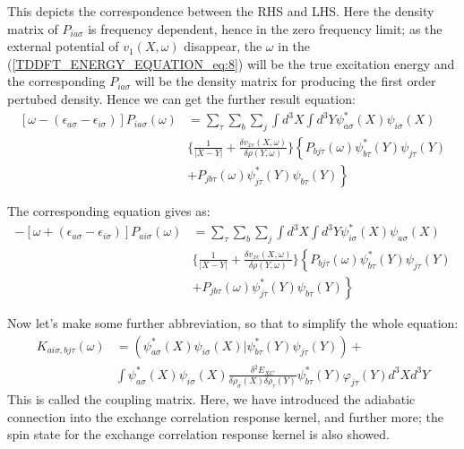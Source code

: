 This depicts the correspondence between the RHS and LHS. Here the
density matrix of $P_{ia\sigma}$ is frequency dependent, hence in the
zero frequency limit; as the external potential of $v_{1}(X,\omega)$
disappear, the $\omega$ in the (\ref{TDDFT_ENERGY_EQUATION_eq:8})
will be the true excitation energy and the corresponding
$P_{ia\sigma}$ will be the density matrix for producing the first
order pertubed density. Hence we can get the further result equation:
\begin{equation}
\label{TDDFT_ENERGY_EQUATION_eq:9}
 \begin{split}
\left[ \omega -
(\epsilon_{a\sigma} -
\epsilon_{i\sigma})\right] P_{ia\sigma}(\omega) &= 
\sum_{\tau}\sum_{b}\sum_{j}\int d^{3}X \int d^{3}Y 
\psi_{a\sigma}^{*}(X)\psi_{i\sigma}(X)\\
&\Bigg\{ \frac{1}{|X-Y|} 
+\frac{\delta
v_{xc}(X,\omega)}{\delta
\rho(Y,\omega)}\Bigg\} 
\left\lbrace P_{bj\tau}(\omega)\psi^{*}_{b\tau}(Y)\psi_{j\tau}(Y)
\right. \\
&\left. +
P_{jb\tau}(\omega)\psi^{*}_{j\tau}(Y)\psi_{b\tau}(Y)\right\rbrace 
\end{split}
\end{equation} 

The corresponding equation gives as:
\begin{equation}
\label{TDDFT_ENERGY_EQUATION_eq:10}
 \begin{split}
-\left[ \omega +
(\epsilon_{a\sigma} -
\epsilon_{i\sigma})\right] P_{ai\sigma}(\omega) &= 
\sum_{\tau}\sum_{b}\sum_{j}\int d^{3}X \int d^{3}Y 
\psi_{i\sigma}^{*}(X)\psi_{a\sigma}(X)\\
&\Bigg\{ \frac{1}{|X-Y|} 
+\frac{\delta
v_{xc}(X,\omega)}{\delta
\rho(Y,\omega)}\Bigg\} 
\left\lbrace P_{bj\tau}(\omega)\psi^{*}_{b\tau}(Y)\psi_{j\tau}(Y)
\right. \\
&\left. +
P_{jb\tau}(\omega)\psi^{*}_{j\tau}(Y)\psi_{b\tau}(Y)\right\rbrace 
\end{split}
\end{equation} 

Now let's make some further abbreviation, so that to simplify the
whole equation: 
\begin{align}
\label{TDDFT_ENERGY_EQUATION_eq:11}
 K_{ai\sigma, bj\tau}(\omega) &=
(\psi^{*}_{a\sigma}(X)\psi_{i\sigma}(X)|\psi^{*}_{b\tau}(Y)\psi_{
j\tau}(Y)) + \nonumber \\
&\int
\psi^{*}_{a\sigma}(X)\psi_{i\sigma}(X)  
\frac{\delta^{2} E_{XC}}
{\delta \rho_{\sigma} (X)\delta \rho_{\tau} (Y)}
\psi^{*}_{b\tau}(Y)\varphi_{j\tau}(Y)
d^{3}Xd^{3}Y
\end{align}
This is called the coupling matrix. Here, we have introduced the
adiabatic connection into the exchange correlation response kernel,
and further more; the spin state for the exchange correlation response
kernel is also showed. 

